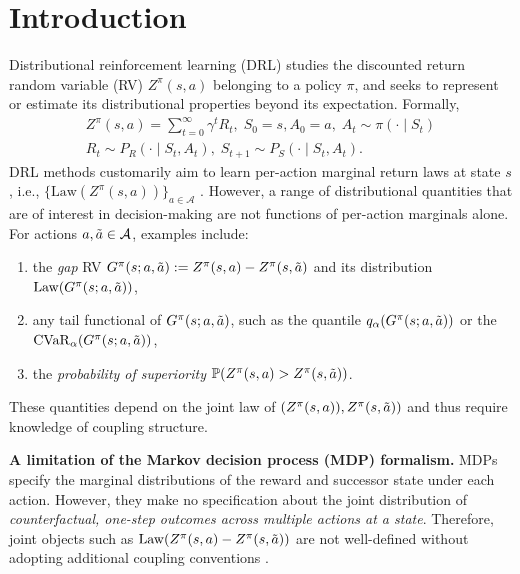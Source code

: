 \documentclass[accepted]{uai2026}
\theoremstyle{plain}
\theoremstyle{definition}
\theoremstyle{remark}
\newcommand{\A}{\mathcal{A}}
\newcommand{\Law}{\mathrm{Law}}
\newcommand{\1}{\mathbbm{1}}
\begin{document}
\section{Introduction}\label{sec:intro}
Distributional reinforcement learning (DRL) studies the discounted return random variable (RV) $Z^\pi(s, a)$ belonging to a policy $\pi$, and seeks to represent or estimate its distributional properties beyond its expectation. Formally,
\begin{equation}
\begin{gathered}
Z^\pi(s, a) = \sum_{t=0}^\infty \gamma^t R_t,\; S_0 =s, A_0 = a, \; A_{t} \sim \pi(\cdot \mid S_t) \\ R_t \sim P_R(\cdot \mid S_t, A_t),\; S_{t+1}\sim P_S(\cdot \mid S_t, A_t).
\end{gathered}
\end{equation}
DRL methods customarily aim to learn per-action marginal return laws at state $s$, i.e., $\{\Law(Z^\pi(s, a))\}_{a \in \A}$ \citep{c51, DRL-textbook}. However, a range of distributional quantities that are of interest in decision-making \citep{artzner1999coherent, rockafellar2000optimization} are not functions of per-action marginals alone. For actions $a, \Tilde{a} \in \A$, examples include:
\begin{enumerate}[leftmargin=*, itemsep=2pt]
\item the \textit{gap} RV $G^\pi(s; a, \Tilde{a}) := Z^\pi(s, a) - Z^\pi(s, \Tilde{a})$ and its distribution $\Law(G^\pi(s; a, \Tilde{a}))$,
\item any tail functional of $G^\pi(s; a, \Tilde{a})$, such as the quantile $q_\alpha(G^\pi(s; a,\Tilde{a}))$ or the $\mathrm{CVaR}_\alpha(G^\pi(s; a,\Tilde{a}))$,
\item the \textit{probability of superiority} $\mathbb{P}(Z^\pi(s, a) > Z^\pi(s, \Tilde{a}))$.
\end{enumerate}
These quantities depend on the joint law of $(Z^\pi(s, a)), \allowbreak Z^\pi(s, \Tilde{a}))$ and thus require knowledge of coupling structure.

\textbf{A limitation of the Markov decision process (MDP) formalism.} MDPs specify the marginal distributions of the reward and successor state under each action. However, they make no specification about the joint distribution of \textit{counterfactual, one-step outcomes across multiple actions at a state}. Therefore, joint objects such as $\Law(Z^\pi(s, a) - Z^\pi(s, \Tilde{a}))$ are not well-defined without adopting additional coupling conventions \citep{wiltzer2024action}.
\end{document}
